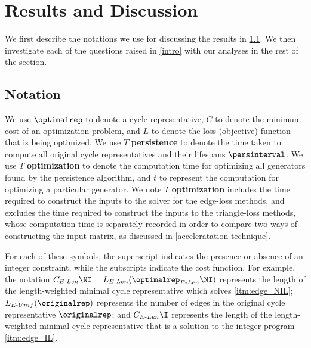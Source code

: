 \section{Results and Discussion}\label{results}

We first describe the notations we use for discussing the results in \se \ref{notations}. We then investigate each of the questions raised in \se \ref{intro} with our analyses in the rest of the section.

\subsection{Notation}\label{notations}

We use $\optimalrep$ to denote a cycle representative, $C$ to denote the minimum cost of an optimization problem, and $L$ to denote the loss (objective) function that is being optimized.
We use $T$ \textbf{persistence} to denote the time taken to compute all original cycle representatives and their lifespans $\persinterval$. We use $T$ \textbf{optimization} to denote the computation time for optimizing all generators found by the persistence algorithm, and $t$ to represent the computation for optimizing a particular generator. We note $T$ \textbf{optimization} includes the time required to construct the inputs to the solver for the edge-loss methods, and excludes the time required to construct the inputs to the triangle-loss methods, whose computation time is separately recorded in order to compare two ways of constructing the input matrix, as discussed in \se \ref{acceleratation technique}. 


For each of these symbols, the superscript indicates the presence or absence of an integer constraint, while the subscripts indicate the cost function. %
For example, the notation
$C_{E\text{-}Len}\NI = L_{E\text{-}Len}(\optimalrep_{E\text{-}Len}\NI)$ represents the length of the length-weighted minimal cycle representative which solves \ref{itm:edge_NIL}; $L_{E\text{-}Unif}(\originalrep)$ represents the number of edges in the original cycle representative $\originalrep$; and $C_{E\text{-}Len}\I$ represents the length of the length-weighted minimal cycle representative that is a solution to the integer program \ref{itm:edge_IL}. 



